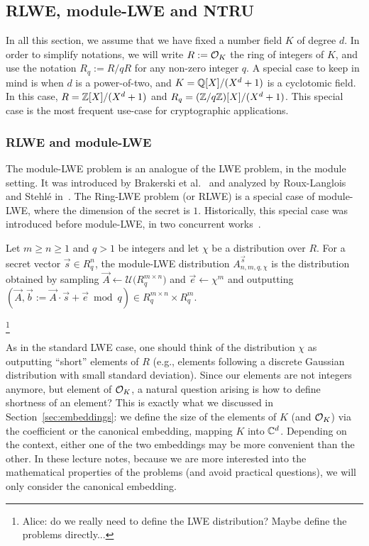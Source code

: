 \subsection{RLWE, module-LWE and NTRU}
\label{sec:rlwe-mlwe-ntru}
In all this section, we assume that we have fixed a number field $K$ of degree $d$. In order to simplify notations, we will write $R := \mathcal{O}_K$ the ring of integers of $K$, and use the notation $R_q := R/qR$ for any non-zero integer $q$. A special case to keep in mind is when $d$ is a power-of-two, and $K = \mathbb{Q}[X]/(X^d+1)$ is a cyclotomic field. In this case, $R = \mathbb{Z}[X]/(X^d+1)$ and $R_q = (\mathbb{Z}/q\mathbb{Z})[X]/(X^d+1)$. This special case is the most frequent use-case for cryptographic applications.

\subsubsection{RLWE and module-LWE}


The module-LWE problem is an analogue of the LWE problem, in the module setting. It was introduced by Brakerski et al.~\cite{MLWE1} and analyzed by Roux-Langlois and Stehlé in~\cite{MLWE2}. The Ring-LWE problem (or RLWE) is a special case of module-LWE, where the dimension of the secret is $1$. Historically, this special case was introduced before module-LWE, in two concurrent works~\cite{RLWE1, RLWE2}.

\begin{definition}
Let $m \geq n \geq 1$ and $q > 1$ be integers and let $\chi$ be a distribution over $R$. For a secret vector $\vec s \in R_q^n$, the module-LWE distribution $A^{\vec s}_{n,m,q,\chi}$ is the distribution obtained by sampling $\vec A \leftarrow \mathcal{U}\Big(R_q^{m \times n}\Big)$ and $\vec e \leftarrow \chi^m$ and outputting $(\vec A, \vec b := \vec A \cdot \vec s + \vec e \bmod q) \in R_q^{m \times n} \times R_q^m$.
\end{definition}

\footnote{Alice: do we really need to define the LWE distribution? Maybe define the problems directly...}

As in the standard LWE case, one should think of the distribution $\chi$ as outputting ``short'' elements of $R$ (e.g., elements following a discrete Gaussian distribution with small standard deviation). Since our elements are not integers anymore, but element of $\mathcal{O}_K$, a natural question arising is how to define shortness of an element? This is exactly what we discussed in Section~\ref{sec:embeddings}: we define the size of the elements of $K$ (and $\mathcal{O}_K$) via the coefficient or the canonical embedding, mapping $K$ into $\mathbb{C}^d$. Depending on the context, either one of the two embeddings may be more convenient than the other. In these lecture notes, because we are more interested into the mathematical properties of the problems (and avoid practical questions), we will only consider the canonical embedding.


